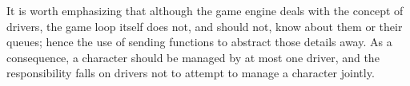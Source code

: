 It is worth emphasizing that although the game engine deals with the concept
of drivers, the game loop itself does not, and should not, know about them or
their queues;
hence the use of sending functions to abstract those details away.
As a consequence, a character should be managed by at most one driver,
and the responsibility falls on drivers not to attempt to manage
a character jointly.

